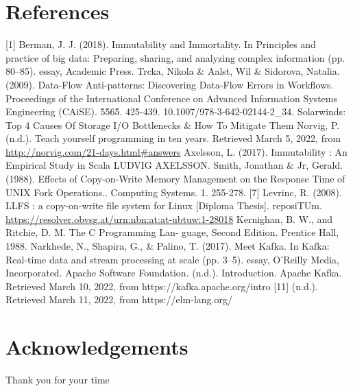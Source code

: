 \documentclass[12pt,twoside]{article}
\begin{document}



\newpage
{}
\setcounter{page}{1}
\section{References}
[1] Berman, J. J. (2018). Immutability and Immortality. In Principles and practice of big data: Preparing, sharing, and analyzing complex information (pp. 80–85). essay, Academic Press. \newline
[2] Trcka, Nikola \& Aalst, Wil \& Sidorova, Natalia. (2009). Data-Flow Anti-patterns: Discovering Data-Flow Errors in Workflows. Proceedings of the International Conference on Advanced Information Systems Engineering (CAiSE). 5565. 425-439. 10.1007/978-3-642-02144-2_34. \newline
[3] Solarwinds: Top 4 Causes Of Storage I/O Bottlenecks \& How To Mitigate Them \newline
[4] Norvig, P. (n.d.). Teach yourself programming in ten years. Retrieved March 5, 2022, from \url{http://norvig.com/21-days.html#answers} \newline
[5] Axelsson, L. (2017). Immutability : An Empirical Study in Scala LUDVIG AXELSSON. \newline 
[6] Smith, Jonathan \& Jr, Gerald. (1988). Effects of Copy-on-Write Memory Management on the Response Time of UNIX Fork Operations.. Computing Systems. 1. 255-278.
[7] Levrinc, R. (2008). LLFS : a copy-on-write file system for Linux [Diploma Thesis]. reposiTUm. \url{https://resolver.obvsg.at/urn:nbn:at:at-ubtuw:1-28018} \newline
[8] Kernighan, B. W., and Ritchie, D. M. The C Programming Lan-
guage, Second Edition. Prentice Hall, 1988. \newline
[9] Narkhede, N., Shapira, G., \& Palino, T. (2017). Meet Kafka. In Kafka: Real-time data and stream processing at scale (pp. 3–5). essay, O'Reilly Media, Incorporated. \newline
[10] Apache Software Foundation. (n.d.). Introduction. Apache Kafka. Retrieved March 10, 2022, from https://kafka.apache.org/intro 
[11]  (n.d.). Retrieved March 11, 2022, from https://elm-lang.org/ 







\newpage
\section{Acknowledgements}
Thank you for your time

\printbibliography
\end{document}
